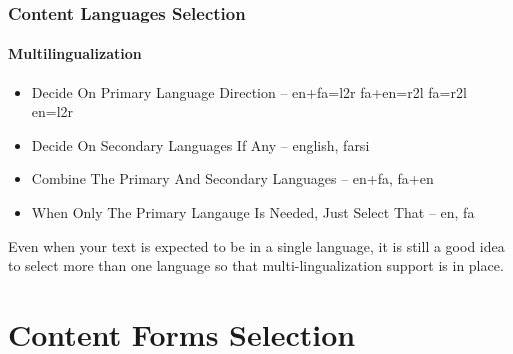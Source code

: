 \begin{comment}
*****  [[elisp:(org-cycle)][| ]]  [[elisp:(blee:ppmm:org-mode-toggle)][Nat]] [[elisp:(beginning-of-buffer)][Top]] [[elisp:(delete-other-windows)][(1)]] || /Frame/ *Label=ContentLanguagesSelection*  Content Languages Selection ::  [[elisp:(org-cycle)][| ]]
\end{comment}

\begin{frame}[fragile,label=ContentLanguagesSelection]
    \frametitle{Content Languages Selection}
    \framesubtitle{Multilingualization}

\begin{itemize}
\item Decide On Primary Language Direction  -- en+fa=l2r  fa+en=r2l fa=r2l en=l2r
\item Decide On Secondary Languages If Any -- english, farsi
\item Combine The Primary And Secondary Languages -- en+fa, fa+en
\item When Only The Primary Langauge Is Needed, Just Select That -- en, fa
\end{itemize}

Even when your text is expected to be in a single language, it is
still a good idea to select more than one language so that
multi-lingualization support is in place.

\end{frame}


\begin{comment}
*  [[elisp:(org-cycle)][| ]] [[elisp:(org-show-subtree)][|=]] [[elisp:(show-children 10)][|V]] [[elisp:(bx:orgm:indirectBufOther)][|>]] [[elisp:(bx:orgm:indirectBufMain)][|I]] [[elisp:(blee:ppmm:org-mode-toggle)][|N]] [[elisp:(org-top-overview)][|O]] [[elisp:(progn (org-shifttab) (org-content))][|C]] [[elisp:(delete-other-windows)][|1]]  /Section/   Content Forms Selection ::  [[elisp:(org-cycle)][| ]]
\end{comment}

\section{Content Forms Selection}

